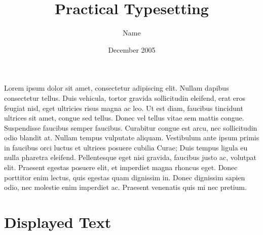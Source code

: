 \documentclass[11pt,a4paper,oneside]{report}
\begin{document}
\title{\color{red}Practical Typesetting}
\author{\color{blue}Name}
\date{\color{green}December 2005}
\maketitle

Lorem ipsum dolor sit amet, consectetur adipiscing elit. Nullam dapibus consectetur tellus. Duis vehicula, tortor
    gravida sollicitudin eleifend, erat eros feugiat nisl, eget ultricies risus magna ac leo. Ut est diam, faucibus
   tincidunt ultrices sit amet, congue sed tellus. Donec vel tellus vitae sem mattis congue. Suspendisse faucibus
   semper faucibus. Curabitur congue est arcu, nec sollicitudin odio blandit at. Nullam tempus vulputate aliquam.
    Vestibulum ante ipsum primis in faucibus orci luctus et ultrices posuere cubilia Curae; Duis tempus ligula eu nulla
    pharetra eleifend. Pellentesque eget nisi gravida, faucibus justo ac, volutpat elit. Praesent egestas posuere elit,
  et imperdiet magna rhoncus eget. Donec porttitor enim lectus, quis egestas quam dignissim in. Donec dignissim sapien
odio, nec molestie enim imperdiet ac. Praesent venenatis quis mi nec pretium.

\section*{Displayed Text}
\end{document}
